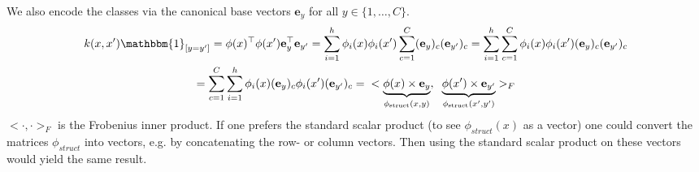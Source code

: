 \documentclass[a4paper]{article}
\newcommand{\e}{\textbf{e}}
\newcommand{\1}{\mathds{1}}
\begin{document}
We also encode the classes via the canonical base vectors 
$\e_y$ for all $y\in \{1,\ldots,C\}$.
\begin{gather*}
	k(x,x')\mathbbm{1}_{[y=y']}
	=
	\phi(x)^\top \phi(x') \e^\top_y \e_{y'}
	=
	\sum_{i=1}^h\phi_{i}(x)\phi_{i}(x')\sum_{c=1}^C(\e_y)_c (\e_{y'})_c
	=
	\sum_{i=1}^h\sum_{c=1}^C\phi_{i}(x)\phi_{i}(x') (\e_y)_c (\e_{y'})_c
	\\
	=
	\sum_{c=1}^C \sum_{i=1}^h \phi_{i}(x)(\e_y)_c \phi_{i}(x') (\e_{y'})_c 	
	=
	\hspace{2mm}
	<
	\underbrace{
		\phi(x)\times \e_y 
	}_{\phi_{\text{struct}}(x,y)}
	,
	\hspace{2mm}
	\underbrace{
	\phi(x')\times \e_{y'}
	}_{\phi_{\text{struct}}(x',y')}
	>_F
\end{gather*}
$<\cdot, \cdot>_F$ is the Frobenius inner product. If one prefers
the standard scalar product (to see $\phi_{struct}(x)$ as a vector) 
one could convert the matrices $\phi_{struct}$ into 
vectors, e.g. by concatenating the row- or column vectors. Then using 
the standard scalar product on these vectors would yield the same result. 
  
\end{document}
